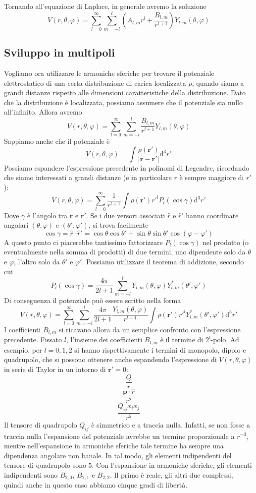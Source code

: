 \documentclass[a4paper,11pt]{book}
\newcommand{\dif}{\mathrm{d}}
\renewcommand{\vec}[1]{\mathbf{#1}}
\theoremstyle{theorem}
\theoremstyle{definition}
\begin{document}
Tornando all'equazione di Laplace, in generale avremo la soluzione
\[V(r,\theta,\varphi)=\sum_{l=0}^{\infty}\sum_{m=-l}^{l}\left(A_{l,m}r^l+\frac{B_{l,m}}{r^{l+1}}\right)Y_{l,m}(\theta,\varphi)\]
\subsection{Sviluppo in multipoli}
Vogliamo ora utilizzare le armoniche sferiche per trovare il potenziale elettrostatico di una certa distribuzione di carica localizzata $\rho$, quando siamo a grandi distanze rispetto alle dimensioni caratteristiche della distribuzione. Dato che la distribuzione è localizzata, possiamo assumere che il potenziale sia nullo all'infinito. Allora avremo
\[V(r,\theta,\varphi)=\sum_{l=0}^{\infty}\sum_{m=-l}^{l}\frac{B_{l,m}}{r^{l+1}}Y_{l,m}(\theta,\varphi)\]
Sappiamo anche che il potenziale è
\[V(r,\theta,\varphi)=\int\frac{\rho(\vec{r}')}{|\vec{r}-\vec{r}'|}\dif^3r'\]
Possiamo espandere l'espressione precedente in polinomi di Legendre, ricordando che siamo interessati a grandi distanze (e in particolare $r$ è sempre maggiore di $r'$):
\[V(r,\theta,\varphi)=\sum_{l=0}^{\infty}\frac{1}{r^{l+1}}\int\rho(\vec{r}')r'^lP_l(\cos\gamma)\dif^3r'\]
Dove $\gamma$ è l'angolo tra $\vec{r}$ e $\vec{r}'$. Se i due versori associati $\hat{r}$ e $\hat{r}'$ hanno coordinate angolari $(\theta,\varphi)$ e $(\theta',\varphi')$, si trova facilmente
\[\cos\gamma=\hat{r}\cdot\hat{r}'=\cos\theta\cos\theta'+\sin\theta\sin\theta'\cos(\varphi-\varphi')\]
A questo punto ci piacerebbe tantissimo fattorizzare $P_l(\cos\gamma)$ nel prodotto (o eventualmente nella somma di prodotti) di due termini, uno dipendente solo da $\theta$ e $\varphi$, l'altro solo da $\theta'$ e $\varphi'$. Possiamo utilizzare il teorema di addizione, secondo cui
\[P_l(\cos\gamma)=\frac{4\pi}{2l+1}\sum_{m=-l}^{l}Y_{l,m}(\theta,\varphi)Y^*_{l,m}(\theta',\varphi')\]
Di conseguenza il potenziale può essere scritto nella forma
\[V(r,\theta,\varphi)=\sum_{l=0}^{\infty}\sum_{m=-l}^{l}\frac{4\pi}{2l+1}\frac{Y_{l,m}(\theta,\varphi)}{r^{l+1}}\int\rho(\vec{r}')r'^lY^*_{l,m}(\theta',\varphi')\dif^3r'\]
I coefficienti $B_{l,m}$ si ricavano allora da un semplice confronto con l'espressione precedente. Fissato $l$, l'insieme dei coefficienti $B_{l,m}$ è il termine di $2^l$-polo. Ad esempio, per $l=0,1,2$ si hanno rispettivamente i termini di monopolo, dipolo e quadrupolo, che si possono ottenere anche espandendo l'espressione di $V(r,\theta,\varphi)$ in serie di Taylor in un intorno di $\vec{r}'=0$:
\[\frac{Q}{r}\]
\[\frac{\vec{p}\cdot\hat{r}}{r^2}\]
\[\frac{Q_{ij}x_ix_j}{r^5}\]
Il tensore di quadrupolo $Q_{ij}$ è simmetrico e a traccia nulla. Infatti, se non fosse a traccia nulla l'espansione del potenziale avrebbe un termine proporzionale a $r^{-3}$, mentre nell'espansione in armoniche sferiche tale termine ha sempre una dipendenza angolare non banale. In tal modo, gli elementi indipendenti del tensore di quadrupolo sono 5. Con l'espansione in armoniche sferiche, gli elementi indipendenti sono $B_{2,0}$, $B_{2,1}$ e $B_{2,2}$. Il primo è reale, gli altri due complessi, quindi anche in questo caso abbiamo cinque gradi di libertà.
\end{document}
